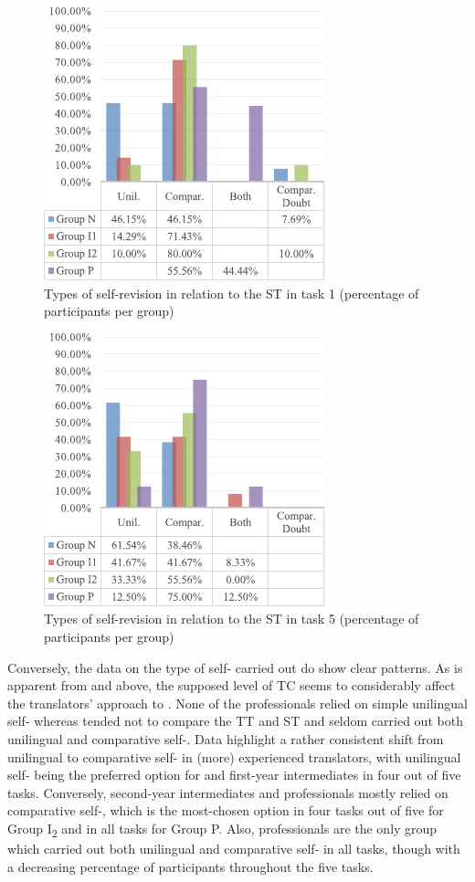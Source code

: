\documentclass[output=paper]{LSP/langsci}
\begin{document}

\begin{figure}
 \includegraphics[width=.4\textwidth]{figures/quinci/figure5.pdf}
 \caption{Types of self-revision in relation to the ST in task 1 (percentage of participants per group)}
 \label{quinci:fig:5}
\end{figure}

\begin{figure}
 \includegraphics[width=.4\textwidth]{figures/quinci/figure6.pdf}
 \caption{Types of self-revision in relation to the ST in task 5 (percentage of participants per group)}
 \label{quinci:fig:6}
\end{figure}

Conversely, the data on the type of self- carried out do show clear patterns. As is apparent from  and  above, the supposed level of TC seems to considerably affect the translators' approach to . None of the professionals relied on simple unilingual self- whereas  tended not to compare the TT and ST and seldom carried out both unilingual and comparative self-. Data highlight a rather consistent shift from unilingual to comparative self- in (more) experienced translators, with unilingual self- being the preferred option for  and first-year intermediates in four out of five tasks. Conversely, second-year intermediates and professionals mostly relied on comparative self-, which is the most-chosen option in four tasks out of five for Group I\textsubscript{2} and in all tasks for Group P. Also, professionals are the only group which carried out both unilingual and comparative self- in all tasks, though with a decreasing percentage of participants throughout the five tasks.
\end{document}
